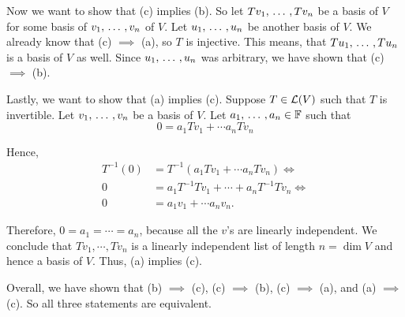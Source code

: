 \begin{xrcs}
\begin{xprf}
    \StepThree Now we want to show that (c) implies (b). So let $T v_1, {\, \ldots \,\,}, T v_n$ be a basis of $V$ for some basis of $v_1, {\, \ldots \,\,}, v_n$ of $V$. Let $u_1, {\, \ldots \,\,}, u_n$ be another basis of $V$. We already know that (c)
    $\implies$ (a), so $T$ is injective. This means, that $T u_1, {\, \ldots \,\,}, T u_n$ is a basis of $V$ as well. Since $u_1, {\, \ldots \,\,}, u_n$ was arbitrary, we have shown that (c) $\implies$ (b).

    \StepFour Lastly, we want to show that (a) implies (c). Suppose $T \in \mathcal{L}(V)$ such that $T$ is invertible. Let $v_1, {\, \ldots \,\,}, v_n$ be a basis of $V$. Let $a_1, {\, \ldots \,\,}, a_n \in \mathbb{F}$ such that
    \begin{equation}
      0= a_1 T v_1 + \cdots a_n T v_n
    \end{equation}

    Hence,
    \begin{equation}
      \begin{aligned}
        T^{-1} (0) &= T^{-1} (a_1 T v_1 + \cdots a_n T v_n) \iff \\
        0          &= a_1 T^{-1} T v_1 + \cdots + a_n T^{-1} T v_n \iff \\
        0          &= a_1 v_1 + \cdots a_n v_n.
      \end{aligned}
    \end{equation}

    Therefore, $0 = a_1 = \cdots = a_n$, because all the $v$'s are linearly independent. We conclude that $Tv_1, \cdots, T v_n$ is a linearly independent list of length $n = \dim V$ and hence a basis of $V$. Thus, (a) implies (c).

    Overall, we have shown that (b) $\implies$ (c), (c) $\implies$ (b), (c) $\implies$ (a), and (a) $\implies$ (c). So all three statements are equivalent.
  \end{xprf}
\end{xrcs}

